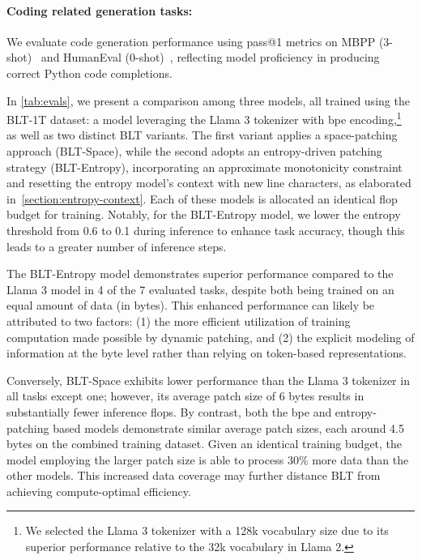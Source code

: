 \paragraph{Coding related generation tasks:} We evaluate code generation performance using pass@1 metrics on MBPP (3-shot)~\citep{Eval_MBPP} and HumanEval (0-shot)~\citep{Eval_HumanEval}, reflecting model proficiency in producing correct Python code completions.

In \autoref{tab:evals}, we present a comparison among three models, all trained using the {\textsc BLT}-1T dataset: a model leveraging the Llama 3 tokenizer with bpe encoding,\footnote{We selected the Llama 3 tokenizer with a 128k vocabulary size due to its superior performance relative to the 32k vocabulary in Llama 2.} as well as two distinct {\textsc BLT} variants. The first variant applies a space-patching approach ({\textsc BLT}-Space), while the second adopts an entropy-driven patching strategy ({\textsc BLT}-Entropy), incorporating an approximate monotonicity constraint and resetting the entropy model’s context with new line characters, as elaborated in~\autoref{section:entropy-context}. Each of these models is allocated an identical flop budget for training. Notably, for the {\textsc BLT}-Entropy model, we lower the entropy threshold from 0.6 to 0.1 during inference to enhance task accuracy, though this leads to a greater number of inference steps.

The {\textsc BLT}-Entropy model demonstrates superior performance compared to the Llama 3 model in 4 of the 7 evaluated tasks, despite both being trained on an equal amount of data (in bytes). This enhanced performance can likely be attributed to two factors: (1) the more efficient utilization of training computation made possible by dynamic patching, and (2) the explicit modeling of information at the byte level rather than relying on token-based representations.

Conversely, {\textsc BLT}-Space exhibits lower performance than the Llama 3 tokenizer in all tasks except one; however, its average patch size of 6 bytes results in substantially fewer inference flops. By contrast, both the bpe and entropy-patching based models demonstrate similar average patch sizes, each around 4.5 bytes on the combined training dataset. Given an identical training budget, the model employing the larger patch size is able to process 30\% more data than the other models. This increased data coverage may further distance {\textsc BLT} from achieving compute-optimal efficiency.

